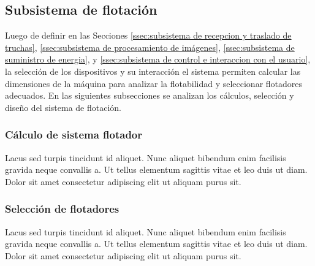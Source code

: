 \subsection{Subsistema de flotación}
\label{ssec:subsistema de flotacion}

Luego de definir en las Secciones \ref{ssec:subsistema de recepcion y traslado de truchas}, \ref{ssec:subsistema de procesamiento de imágenes}, \ref{ssec:subsistema de suministro de energia}, y \ref{ssec:subsistema de control e interaccion con el usuario}, la selección de los dispositivos y su interacción el sistema permiten calcular las dimensiones de la máquina para analizar la flotabilidad y seleccionar flotadores adecuados. En las siguientes subsecciones se analizan los cálculos, selección y diseño del sistema de flotación.

\subsubsection{Cálculo de sistema flotador}

Lacus sed turpis tincidunt id aliquet. Nunc aliquet bibendum enim facilisis gravida neque convallis a. Ut tellus elementum sagittis vitae et leo duis ut diam. Dolor sit amet consectetur adipiscing elit ut aliquam purus sit. 

\subsubsection{Selección de flotadores}

Lacus sed turpis tincidunt id aliquet. Nunc aliquet bibendum enim facilisis gravida neque convallis a. Ut tellus elementum sagittis vitae et leo duis ut diam. Dolor sit amet consectetur adipiscing elit ut aliquam purus sit. 


